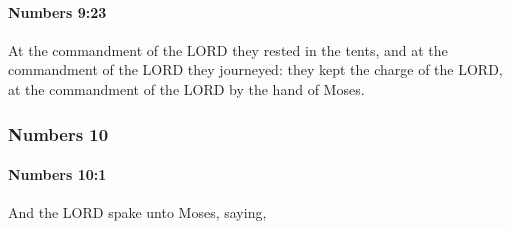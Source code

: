 		\paragraph{Numbers 9:23} %
			\label{NUMBERS-9-23}

			At the commandment of the LORD they rested in the tents, and at the commandment of the LORD they journeyed: they kept the charge of the LORD, at the commandment of the LORD by the hand of Moses.

	\subsubsection{Numbers 10} %
		\label{NUMBERS-10}

		\paragraph{Numbers 10:1} %
			\label{NUMBERS-10-1}

			And the LORD spake unto Moses, saying,

